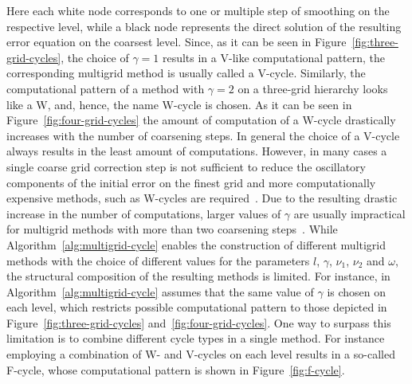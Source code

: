 Here each white node corresponds to one or multiple step of smoothing on the respective level, while a black node represents the direct solution of the resulting error equation on the coarsest level.
Since, as it can be seen in Figure~\ref{fig:three-grid-cycles}, the choice of $\gamma = 1$ results in a V-like computational pattern, the corresponding multigrid method is usually called a V-cycle.
Similarly, the computational pattern of a method with $\gamma = 2$ on a three-grid hierarchy looks like a W, and, hence, the name W-cycle is chosen.
As it can be seen in Figure~\ref{fig:four-grid-cycles} the amount of computation of a W-cycle drastically increases with the number of coarsening steps.
In general the choice of a V-cycle always results in the least amount of computations.
However, in many cases a single coarse grid correction step is not sufficient to reduce the oscillatory components of the initial error on the finest grid and more computationally expensive methods, such as W-cycles are required~\cite{trottenberg2000multigrid}.
Due to the resulting drastic increase in the number of computations, larger values of $\gamma$ are usually impractical for multigrid methods with more than two coarsening steps~\cite{trottenberg2000multigrid}.
While Algorithm~\ref{alg:multigrid-cycle} enables the construction of different multigrid methods with the choice of different values for the parameters $l$, $\gamma$, $\nu_1$, $\nu_2$ and $\omega$, the structural composition of the resulting methods is limited.
For instance, in Algorithm~\ref{alg:multigrid-cycle} assumes that the same value of $\gamma$ is chosen on each level, which restricts possible computational pattern to those depicted in Figure~\ref{fig:three-grid-cycles} and~\ref{fig:four-grid-cycles}.
One way to surpass this limitation is to combine different cycle types in a single method.
For instance employing a combination of W- and V-cycles on each level results in a so-called F-cycle, whose computational pattern is shown in Figure~\ref{fig:f-cycle}.
